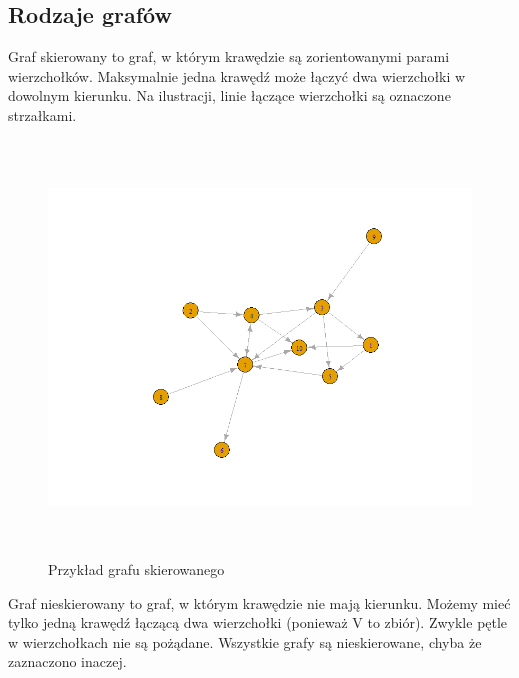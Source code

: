 \subsection{Rodzaje grafów}

Graf skierowany to graf, w którym krawędzie są zorientowanymi parami wierzchołków.
Maksymalnie jedna krawędź może łączyć dwa wierzchołki w dowolnym kierunku.
Na ilustracji, linie łączące wierzchołki są oznaczone strzałkami.

\begin{figure}[ht]
	\centering
	\includegraphics[height=11cm]{partials/images/graph_directed.png}
	\caption{Przykład grafu skierowanego}
\label{Fig:GraphUndirected}
\end{figure}
\FloatBarrier

Graf nieskierowany to graf, w którym krawędzie nie mają kierunku.
Możemy mieć tylko jedną krawędź łączącą dwa wierzchołki (ponieważ V to zbiór).
Zwykle pętle w wierzchołkach nie są pożądane.
Wszystkie grafy są nieskierowane, chyba że zaznaczono inaczej.

